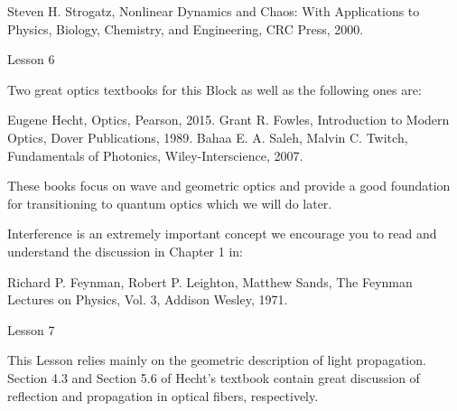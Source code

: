Steven H. Strogatz, Nonlinear Dynamics and Chaos: With Applications to Physics, Biology, Chemistry, and Engineering, CRC Press, 2000.

Lesson 6

Two great optics textbooks for this Block as well as the following ones are:

Eugene Hecht, Optics, Pearson, 2015.
Grant R. Fowles, Introduction to Modern Optics, Dover Publications, 1989.
Bahaa E. A. Saleh, Malvin C. Twitch, Fundamentals of Photonics, Wiley-Interscience, 2007.

These books focus on wave and geometric optics and provide a good foundation for transitioning to quantum optics which we will do later.

Interference is an extremely important concept we encourage you to read and understand the discussion in Chapter 1 in:

Richard P. Feynman, Robert P. Leighton, Matthew Sands, The Feynman Lectures on Physics, Vol. 3, Addison Wesley, 1971.

Lesson 7

This Lesson relies mainly on the geometric description of light propagation. Section 4.3 and Section 5.6 of Hecht’s textbook contain great discussion of reflection and propagation in optical fibers, respectively.
